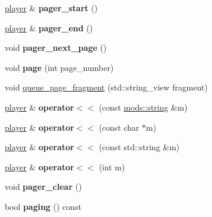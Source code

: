 \begin{DoxyCompactItemize}
\hyperlink{classmods_1_1player}{player} \& {\bfseries pager\+\_\+start} ()
\item 
\mbox{\label{classmods_1_1player_a6ca23997dee1d8b94137da8b3a2a17a5}} 
\hyperlink{classmods_1_1player}{player} \& {\bfseries pager\+\_\+end} ()
\item 
\mbox{\label{classmods_1_1player_a90fb7668ff623bce96c51255fc10b287}} 
void {\bfseries pager\+\_\+next\+\_\+page} ()
\item 
\mbox{\label{classmods_1_1player_ac86a2bee53a0931b3ebed1ec18385ae0}} 
void {\bfseries page} (int page\+\_\+number)
\item 
void \hyperlink{classmods_1_1player_a43832fcf34ddb3e7968a26703d3250cd}{queue\+\_\+page\+\_\+fragment} (std\+::string\+\_\+view fragment)
\item 
\mbox{\label{classmods_1_1player_a09dabbd02a2418ca90a96f715e69bb68}} 
\hyperlink{classmods_1_1player}{player} \& {\bfseries operator$<$$<$} (const \hyperlink{structmods_1_1string}{mods\+::string} \&m)
\item 
\mbox{\label{classmods_1_1player_ac6c0d4b3f9047117ef797698df4b7306}} 
\hyperlink{classmods_1_1player}{player} \& {\bfseries operator$<$$<$} (const char $\ast$m)
\item 
\mbox{\label{classmods_1_1player_ad09209c13b4f58e1bcd51897f8bb1feb}} 
\hyperlink{classmods_1_1player}{player} \& {\bfseries operator$<$$<$} (const std\+::string \&m)
\item 
\mbox{\label{classmods_1_1player_a5c60061a3e82ade30f6b3ba5d94f7227}} 
\hyperlink{classmods_1_1player}{player} \& {\bfseries operator$<$$<$} (int m)
\item 
\mbox{\label{classmods_1_1player_a09de19290c2191f95d8e07937c76dc1d}} 
void {\bfseries pager\+\_\+clear} ()
\item 
\mbox{\label{classmods_1_1player_a2ee6cf11d335225a4e2e035d419b8076}} 
bool {\bfseries paging} () const
\item 
\mbox{\label{classmods_1_1player_ad8b5e48c762c234c99406dbb9d4510bb}} 

\end{DoxyCompactItemize}
